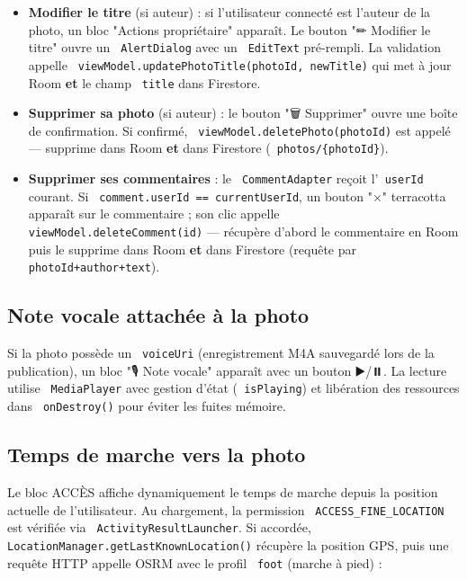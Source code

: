 \documentclass[a4paper,12pt,openany]{report}
\newcommand{\ic}[1]{\texttt{\small\colorbox{lightbg}{\color{navy!90} #1}}}
\begin{document}
\begin{itemize}
    est inséré avec le champ \ic{photoId} renseigné, ce qui permet au chat
    du groupe d'afficher une carte "🔗 Photo partagée" cliquable distincte
    des messages texte et des posts publiés directement dans le groupe.
  \item \textbf{Modifier le titre} (si auteur) : si l'utilisateur connecté est
    l'auteur de la photo, un bloc "Actions propriétaire" apparaît. Le bouton
    "✏ Modifier le titre" ouvre un \ic{AlertDialog} avec un \ic{EditText}
    pré-rempli. La validation appelle \ic{viewModel.updatePhotoTitle(photoId, newTitle)}
    qui met à jour Room \textbf{et} le champ \ic{title} dans Firestore.
  \item \textbf{Supprimer sa photo} (si auteur) : le bouton "🗑 Supprimer" ouvre
    une boîte de confirmation. Si confirmé, \ic{viewModel.deletePhoto(photoId)} est
    appelé — supprime dans Room \textbf{et} dans Firestore (\ic{photos/\{photoId\}}).
  \item \textbf{Supprimer ses commentaires} : le \ic{CommentAdapter} reçoit
    l'\ic{userId} courant. Si \ic{comment.userId == currentUserId}, un bouton "×"
    terracotta apparaît sur le commentaire ; son clic appelle
    \ic{viewModel.deleteComment(id)} — récupère d'abord le commentaire en Room puis
    le supprime dans Room \textbf{et} dans Firestore (requête par \ic{photoId+author+text}).
\end{itemize}

\subsection{Note vocale attachée à la photo}

Si la photo possède un \ic{voiceUri} (enregistrement M4A sauvegardé lors de la
publication), un bloc "🎙 Note vocale" apparaît avec un bouton ▶/⏸. La lecture
utilise \ic{MediaPlayer} avec gestion d'état (\ic{isPlaying}) et libération des
ressources dans \ic{onDestroy()} pour éviter les fuites mémoire.

\subsection{Temps de marche vers la photo}

Le bloc ACCÈS affiche dynamiquement le temps de marche depuis la position actuelle
de l'utilisateur. Au chargement, la permission \ic{ACCESS\_FINE\_LOCATION} est
vérifiée via \ic{ActivityResultLauncher}. Si accordée, \ic{LocationManager.getLastKnownLocation()}
récupère la position GPS, puis une requête HTTP appelle OSRM avec le profil
\ic{foot} (marche à pied) :
\end{document}
